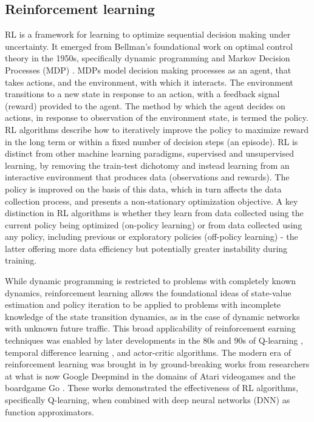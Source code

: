 \subsection{Reinforcement learning}
\label{sec:background_rl}

RL is a framework for learning to optimize sequential decision making under uncertainty. It emerged from Bellman's foundational work on optimal control theory in the 1950s, specifically dynamic programming and Markov Decision Processes (MDP) \cite{bellman_theory_1954,bellman_markovian_1957}. MDPs model decision making processes as an agent, that takes actions, and the environment, with which it interacts. The environment transitions to a new state in response to an action, with a feedback signal (reward) provided to the agent. The method by which the agent decides on actions, in response to observation of the environment state, is termed the policy. RL algorithms describe how to iteratively improve the policy to maximize reward in the long term or within a fixed number of decision steps (an episode). RL is distinct from other machine learning paradigms, supervised and unsupervised learning, by removing the train-test dichotomy and instead learning from an interactive environment that produces data (observations and rewards). The policy is improved on the basis of this data, which in turn affects the data collection process, and presents a non-stationary optimization objective. A key distinction in RL algorithms is whether they learn from data collected using the current policy being optimized (on-policy learning) or from data collected using any policy, including previous or exploratory policies (off-policy learning) - the latter offering more data efficiency but potentially greater instability during training.

While dynamic programming is restricted to problems with completely known dynamics, reinforcement learning allows the foundational ideas of state-value estimation and policy iteration to be applied to problems with incomplete knowledge of the state transition dynamics, as in the case of dynamic networks with unknown future traffic. This broad applicability of reinforcement earning techniques was enabled by later developments in the 80s and 90s of Q-learning \cite{watkins_learning_1989}, temporal difference learning \cite{sutton_learning_1988}, and actor-critic algorithms. The modern era of reinforcement learning was brought in by ground-breaking works from researchers at what is now Google Deepmind in the domains of Atari videogames \cite{mnih_human-level_2015} and the boardgame Go \cite{silver_mastering_2016}. These works demonstrated the effectiveness of RL algorithms, specifically Q-learning, when combined with deep neural networks (DNN) as function approximators.

